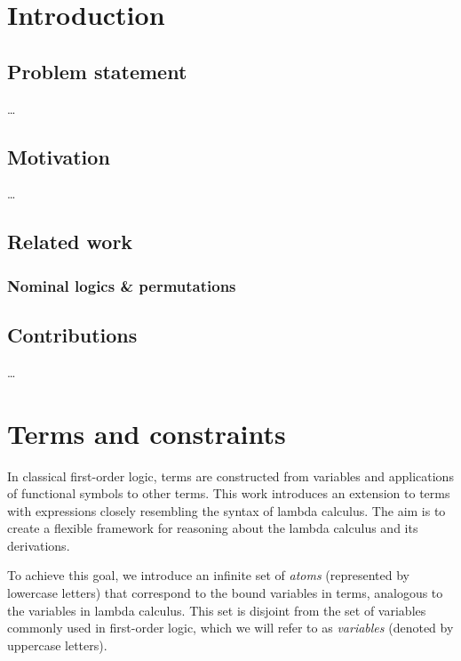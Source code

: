 \documentclass[english, mgr]{iithesis}
\author         {Dominik Gulczyński}
\date           {\today}                     %
\renewcommand{\it}[1]{\textit{#1}}
\begin{document}
\chapter{Introduction}

\section{Problem statement}
\dots

\section{Motivation}
\dots

\section{Related work}
\subsection{Nominal logics \& permutations}

\section{Contributions}
\dots

\chapter{Terms and constraints}

In classical first-order logic, terms are constructed from variables and applications of functional symbols to other terms.
This work introduces an extension to terms with expressions closely resembling the syntax of lambda calculus.
The aim is to create a flexible framework for reasoning about the lambda calculus and its derivations.

To achieve this goal, we introduce an infinite set of \it{atoms} (represented by lowercase letters)
that correspond to the bound variables in terms, analogous to the variables in lambda calculus.
This set is disjoint from the set of variables commonly used in first-order logic,
which we will refer to as \it{variables} (denoted by uppercase letters).
\end{document}
